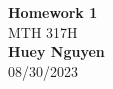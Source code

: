 \begin{titlepage}
    \begin{center}
    {\fontsize{40}{48}\selectfont \bfseries Homework 1} 
    \\\vspace{20pt}
    {\LARGE MTH 317H} \\
    \vspace{20pt}
    \textbf{Huey Nguyen}
    \vspace{8pt}
    \\ 08/30/2023
    \end{center}
\end{titlepage}